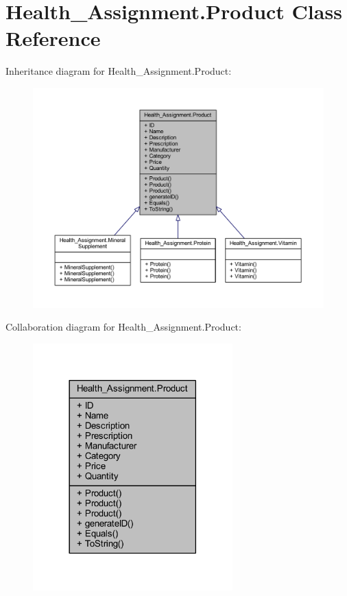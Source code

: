 \hypertarget{class_health___assignment_1_1_product}{}\section{Health\+\_\+\+Assignment.\+Product Class Reference}
\label{class_health___assignment_1_1_product}


Inheritance diagram for Health\+\_\+\+Assignment.\+Product\+:\nopagebreak
\begin{figure}[H]
\begin{center}
\leavevmode
\includegraphics[width=350pt]{class_health___assignment_1_1_product__inherit__graph}
\end{center}
\end{figure}


Collaboration diagram for Health\+\_\+\+Assignment.\+Product\+:\nopagebreak
\begin{figure}[H]
\begin{center}
\leavevmode
\includegraphics[width=218pt]{class_health___assignment_1_1_product__coll__graph}
\end{center}
\end{figure}
